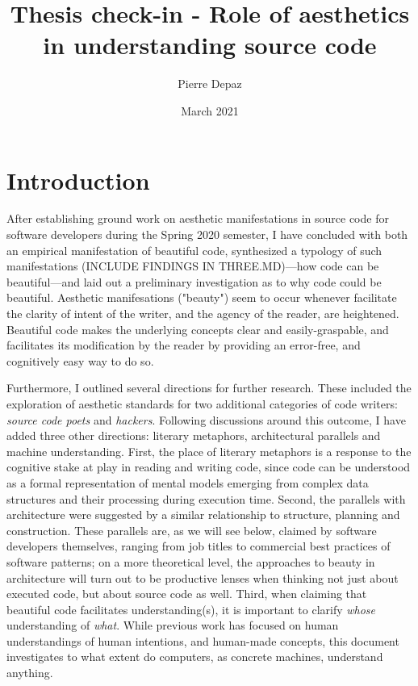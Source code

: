 \documentclass{article}
\begin{document}
\title{Thesis check-in - Role of aesthetics in understanding source code}
\author{Pierre Depaz}
\date{March 2021}
\maketitle

\section{Introduction}

After establishing ground work on aesthetic manifestations in source code for software developers during the Spring 2020 semester, I have concluded with both an empirical manifestation of beautiful code, synthesized a typology of such manifestations (INCLUDE FINDINGS IN THREE.MD)—how code can be beautiful—and laid out a preliminary investigation as to why code could be beautiful. Aesthetic manifesations ("beauty") seem to occur whenever facilitate the clarity of intent of the writer, and the agency of the reader, are heightened. Beautiful code makes the underlying concepts clear and easily-graspable, and facilitates its modification by the reader by providing an error-free, and cognitively easy way to do so.

Furthermore, I outlined several directions for further research. These included the exploration of aesthetic standards for two additional categories of code writers: \emph{source code poets} and \emph{hackers}. Following discussions around this outcome, I have added three other directions: literary metaphors, architectural parallels and machine understanding. First, the place of literary metaphors is a response to the cognitive stake at play in reading and writing code, since code can be understood as a formal representation of mental models emerging from complex data structures and their processing during execution time. Second, the parallels with architecture were suggested by a similar relationship to structure, planning and construction. These parallels are, as we will see below, claimed by software developers themselves, ranging from job titles to commercial best practices of software patterns; on a more theoretical level, the approaches to beauty in architecture will turn out to be productive lenses when thinking not just about executed code, but about source code as well. Third, when claiming that beautiful code facilitates understanding(s), it is important to clarify \emph{whose} understanding of \emph{what}. While previous work has focused on human understandings of human intentions, and human-made concepts, this document investigates to what extent do computers, as concrete machines, understand anything.
\end{document}
